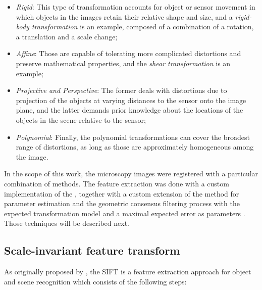 \begin{itemize}
	\item \emph{Rigid}: This type of transformation accounts for object or sensor movement in which objects in the images retain their relative shape and size, and a \emph{rigid-body transformation} is an example, composed of a combination of a rotation, a translation and a scale change; 
	
	\item \emph{Affine}: Those are capable of tolerating more complicated distortions and preserve mathematical properties, and the \emph{shear transformation} is an example;
	
	\item \emph{Projective and Perspective}: The former deals with distortions due to projection of the objects at varying distances to the sensor onto the image plane, and the latter demands prior knowledge about the locations of the objects in the scene relative to the sensor;
	
	\item \emph{Polynomial}: Finally, the polynomial transformations can cover the broadest range of distortions, as long as those are approximately homogeneous among the image.
\end{itemize}


In the scope of this work, the microscopy images were registered with a particular combination of methods. The feature extraction was done with a custom implementation of the , together with a custom extension of the  method for parameter estimation and the geometric consensus filtering process with the expected transformation model and a maximal expected error as parameters \cite{saalfeld2019computational}. Those techniques will be described next.

\subsection{Scale-invariant feature transform}

As originally proposed by , the SIFT is a feature extraction approach for object and scene recognition which consists of the following steps:

